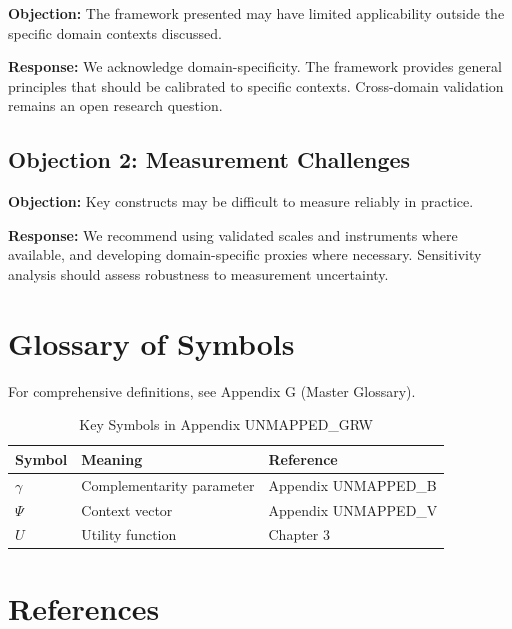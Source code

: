 \textbf{Objection:} The framework presented may have limited applicability
outside the specific domain contexts discussed.

\textbf{Response:} We acknowledge domain-specificity. The framework provides
general principles that should be calibrated to specific contexts. Cross-domain
validation remains an open research question.

\subsection{Objection 2: Measurement Challenges}

\textbf{Objection:} Key constructs may be difficult to measure reliably in
practice.

\textbf{Response:} We recommend using validated scales and instruments where
available, and developing domain-specific proxies where necessary. Sensitivity
analysis should assess robustness to measurement uncertainty.



\section{Glossary of Symbols}
\label{sec:grw-glossary}

For comprehensive definitions, see Appendix G (Master Glossary).

\begin{table}[htbp]
\centering
\caption{Key Symbols in Appendix UNMAPPED_GRW}
\begin{tabular}{lll}
\toprule
\textbf{Symbol} & \textbf{Meaning} & \textbf{Reference} \\
\midrule
$\gamma$ & Complementarity parameter & Appendix UNMAPPED_B \\
$\Psi$ & Context vector & Appendix UNMAPPED_V \\
$U$ & Utility function & Chapter 3 \\
\bottomrule
\end{tabular}
\end{table}


\section{References}
\label{sec:grw-references}

